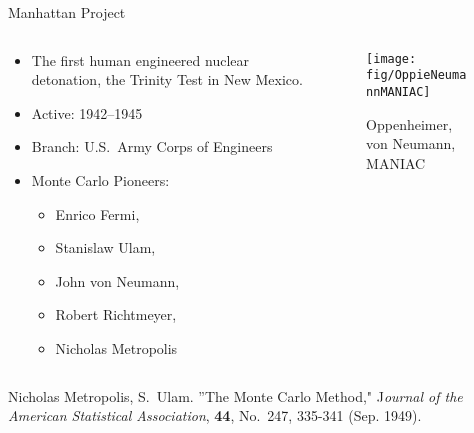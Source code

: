 \documentclass[xcolor=x11names,compress, handout]{beamer}
\renewcommand{\(}{\begin{columns}}
\renewcommand{\)}{\end{columns}}
\newcommand{\<}[1]{\begin{column}{#1}}
\renewcommand{\>}{\end{column}}
\begin{document}
\begin{frame}{Manhattan Project}

\begin{columns}
  \begin{column}{0.5\textwidth}
    \begin{itemize}
    \item The first human engineered nuclear detonation, 
    the Trinity Test in New Mexico.
    \item Active: 1942--1945
    \item Branch: U.S.\ Army Corps of Engineers
    \item Monte Carlo Pioneers:
    \begin{itemize}
      \item Enrico Fermi,
      \item Stanislaw Ulam,
      \item John von Neumann, 
      \item Robert Richtmeyer, 
      \item Nicholas Metropolis
    \end{itemize}
    \end{itemize}
  \end{column}
  \begin{column}{0.5\textwidth}
  	\begin{figure}
  	\begin{center}
  		\texttt{[image: fig/OppieNeumannMANIAC]}
  		\caption{Oppenheimer, von Neumann, MANIAC}
	\end{center}
  	\end{figure}
  \end{column}
\end{columns}
\pause
Nicholas Metropolis, S.\ Ulam. ''The Monte Carlo Method," J\textit{ournal of the American Statistical Association}, \textbf{44}, No.\ 247, 335-341 (Sep. 1949).
\end{frame}
\end{document}
